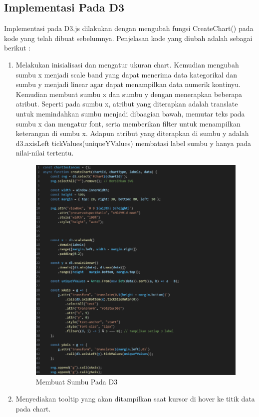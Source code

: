 \subsection{Implementasi Pada D3}
Implementasi pada D3.js dilakukan dengan mengubah fungsi CreateChart() pada kode yang telah dibuat sebelumnya. Penjelasan kode yang diubah adalah sebagai berikut : \\
\begin{enumerate}
	\item Melakukan inisialisasi dan mengatur ukuran chart. Kemudian mengubah sumbu x menjadi scale band yang dapat menerima data kategorikal dan sumbu y menjadi linear agar dapat menampilkan data numerik kontinyu. Kemudian membuat sumbu x dan sumbu y dengan menerapkan beberapa atribut. Seperti pada sumbu x, atribut yang diterapkan adalah translate untuk memindahkan sumbu menjadi dibaagian bawah, memutar teks pada sumbu x dan mengatur font, serta memberikan filter untuk menampilkan keterangan di sumbu x. Adapun atribut yang diterapkan di sumbu y adalah d3.axisLeft tickValues(uniqueYValues) membatasi label sumbu y hanya pada nilai-nilai tertentu.
	\begin{figure}[H]
		\centering
		\includegraphics[width=0.8\linewidth]{gambar/Pembahasan/create axis d3.png}
		\caption{Membuat Sumbu Pada D3}
		\label{Membuat Sumbu Pada D3}
	\end{figure}
	\item Menyediakan tooltip yang akan ditampilkan saat kursor di hover ke titik data pada chart.
	\begin{figure}[H]

\end{figure}
\end{enumerate}

